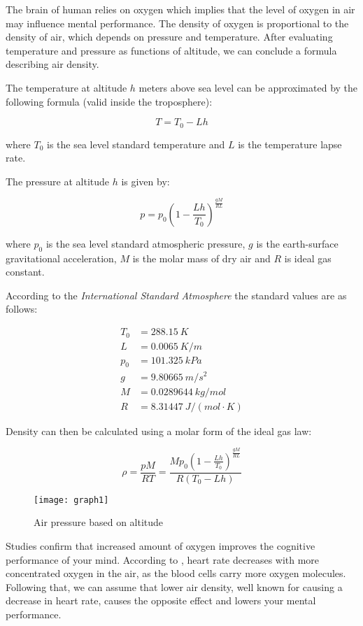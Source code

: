 
The brain of human relies on oxygen which implies that the level of oxygen in air may influence mental performance. The density of oxygen is proportional to the density of air, which depends on pressure and temperature. After evaluating temperature and pressure as functions of altitude, we can conclude a formula describing air density.

The temperature at altitude $h$ meters above sea level can be approximated by the following formula (valid inside the troposphere):

$$T=T_0-Lh$$

\noindent where $T_0$ is the sea level standard temperature and $L$ is the temperature lapse rate.

The pressure at altitude $h$ is given by:

$$p = p_0 \left(1-\frac{Lh}{T_0}\right)^\frac{gM}{RL}$$

\noindent where $p_0$ is the sea level standard atmospheric pressure, $g$ is the earth-surface gravitational acceleration, $M$ is the molar mass of dry air and $R$ is ideal gas constant.

According to the \emph{International Standard Atmosphere} the standard values are as follows:

\begin{align*}
T_0 &= \SI{288.15}{K}\\
L &= \SI{0.0065}{K/m}\\
p_0 &= \SI{101.325}{kPa}\\
g &= \SI{9.80665}{m/s^2}\\
M &= \SI{0.0289644}{kg/mol}\\
R &= \SI{8.31447}{J/(mol\cdot K)}
\end{align*}

Density can then be calculated using a molar form of the ideal gas law:

$$\rho = \frac{pM}{RT} = \frac{M p_0 \left(1-\frac{Lh}{T_0}\right)^\frac{gM}{RL}  }{ R (T_0-Lh)  }$$
\begin{figure}[ht]
    \centering
        \texttt{[image: graph1]}
    \caption{Air pressure based on altitude}
\end{figure}


Studies \cite{Scholey1999,Chung2008,Chung2004} confirm that increased amount of oxygen improves the cognitive performance of your mind. According to \cite{Chung2008}, heart rate decreases with more concentrated oxygen in the air, as the blood cells carry more oxygen molecules. Following that, we can assume that lower air density, well known for causing a decrease in heart rate, causes the opposite effect and lowers your mental performance.

